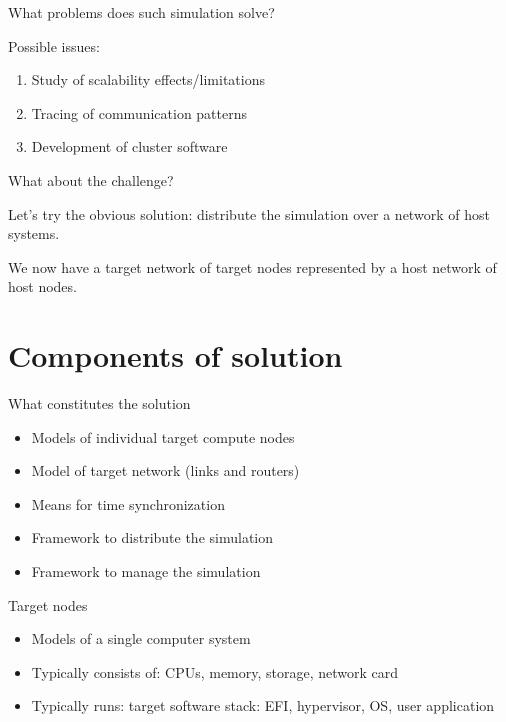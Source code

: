 \begin{frame}{What problems does such simulation solve?}

Possible issues:

\begin{enumerate}
    \item Study of scalability effects/limitations
    \item Tracing of communication patterns
    \item Development of cluster software
\end{enumerate}

\end{frame}

\begin{frame}{What about the challenge?}

Let's try the obvious solution: distribute the simulation over a network of host systems.

We now have a target network of target nodes represented by a host network of host nodes.

\end{frame}


\section{Components of solution}

\begin{frame}{What constitutes the solution}

\begin{itemize}
    \item Models of individual target compute nodes
    \item Model of target network (links and routers)
    \item Means for time synchronization
    \item Framework to distribute the simulation
    \item Framework to manage the simulation
\end{itemize}

\end{frame}

\begin{frame}{Target nodes}

\begin{itemize}
\item Models of a single computer system
\item Typically consists of: CPUs, memory, storage, network card
\item Typically runs: target software stack: EFI, hypervisor, OS, user application
\end{itemize}

\end{frame}

